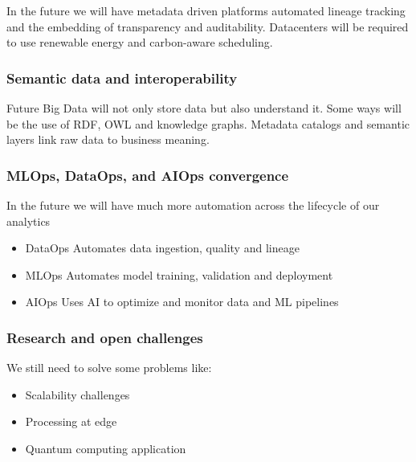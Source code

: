 In the future we will have metadata driven platforms automated lineage tracking and the embedding of transparency and auditability. Datacenters will be required to use renewable energy and carbon-aware scheduling. 

\subsubsection{Semantic data and interoperability}

Future Big Data will not only store data but also understand it. Some ways will be the use of RDF, OWL and knowledge graphs. Metadata catalogs and semantic layers link raw data to business meaning. 

\subsubsection{MLOps, DataOps, and AIOps convergence}

In the future we will have much more automation across the lifecycle of our analytics

\begin{itemize}
    \item DataOps \ra Automates data ingestion, quality and lineage
    \item MLOps \ra Automates model training, validation and deployment
    \item AIOps \ra Uses AI to optimize and monitor data and ML pipelines
\end{itemize}

\subsubsection{Research and open challenges}

We still need to solve some problems like:

\begin{itemize}
    \item Scalability challenges
    \item Processing at edge
    \item Quantum computing application
\end{itemize}